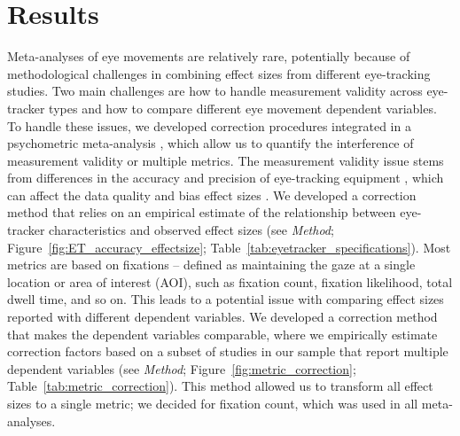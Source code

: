 
\section{Results}

Meta-analyses of eye movements are relatively rare, potentially because of methodological challenges in combining effect sizes from different eye-tracking studies. Two main challenges are how to handle measurement validity across eye-tracker types and how to compare different eye movement dependent variables. To handle these issues, we developed correction procedures integrated in a psychometric meta-analysis \citep{hunter2004a}, which allow us to quantify the interference of measurement validity or multiple metrics. The measurement validity issue stems from differences in the accuracy and precision of eye-tracking equipment \citep{holmqvist2015a}, which can affect the data quality and bias effect sizes \citep{orquin2016a}. We developed a correction method that relies on an empirical estimate of the relationship between eye-tracker characteristics and observed effect sizes (see \textit{Method}; Figure~\ref{fig:ET_accuracy_effectsize}; Table~\ref{tab:eyetracker_specifications}). Most metrics are based on fixations -- defined as maintaining the gaze at a single location or area of interest (AOI), such as fixation count, fixation likelihood, total dwell time, and so on. This leads to a potential issue with comparing effect sizes reported with different dependent variables. We developed a correction method that makes the dependent variables comparable, where we empirically estimate correction factors based on a subset of studies in our sample that report multiple dependent variables (see \textit{Method}; Figure~\ref{fig:metric_correction}; Table~\ref{tab:metric_correction}). This method allowed us to transform all effect sizes to a single metric; we decided for fixation count, which was used in all meta-analyses. 


